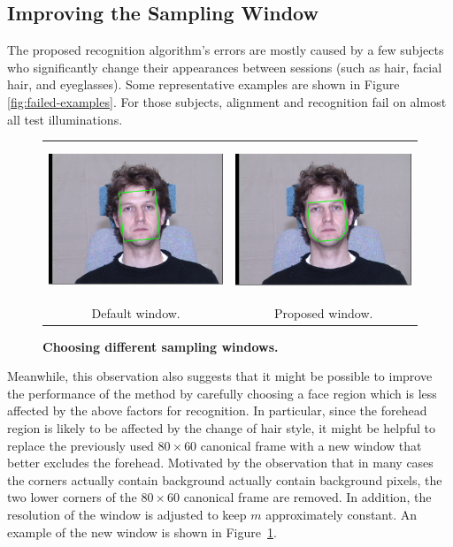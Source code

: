 \subsection{Improving the Sampling Window}
The proposed recognition algorithm's errors are mostly caused by a few subjects who
significantly change their appearances between sessions (such
as hair, facial hair, and eyeglasses). Some representative
examples are shown in Figure \ref{fig:failed-examples}. For those subjects, alignment and recognition fail on
almost all test illuminations.
\begin{figure}[b]
\centering
{
\begin{tabular}{@{}cc@{}}
\includegraphics[trim=1.9in .7in 1.9in .5in, clip, height=1.8in]{figures_pami/example.png} &
\includegraphics[trim=1.9in .7in 1.9in .5in, clip, height=1.8in]{figures_pami/example_new.png} \\
Default window. & Proposed window.
\end{tabular}
}
\caption{\small{\bf Choosing different sampling windows.}}
\label{fig:new-mask}
\end{figure}
Meanwhile, this observation also suggests that it might be possible to improve
the performance of the method by carefully choosing a face region which is less
affected by the above factors for recognition. In particular, since the
forehead region is likely to be affected by the change of hair style, it might
be helpful to replace the previously used $80 \times 60$ canonical frame with a
new window that better excludes the forehead.  Motivated by the observation
that in many cases the corners actually contain background actually contain
background pixels, the two lower corners of the $80 \times 60$ canonical frame
are removed.  In addition, the resolution of the window is adjusted to keep $m$
approximately constant.  An example of the new window is shown in
Figure~\ref{fig:new-mask}.

